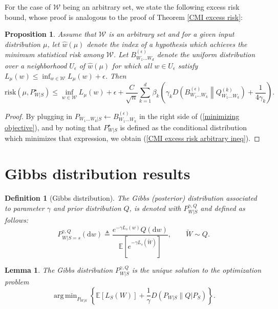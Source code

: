 \documentclass{article}
\DeclareMathOperator*{\argmin}{arg\,min}
\newtheorem{definition}{Definition}
\newtheorem{lemma}{Lemma}
\newtheorem{proposition}{Proposition}
\newcommand{\E}{\mathbb{E}}
\newcommand{\risk}[0]{\mathrm{risk}}
\newcommand{\W}[0]{\mathcal{W}}
\begin{document}
For the case of $\W$ being an arbitrary set, we state the following excess risk bound, whose proof is analogous to the proof of Theorem \ref{CMI excess risk}: 
\begin{proposition}\label{CMI excess risk arbitrary} Assume that $\W$ is an arbitrary set and for a given input distribution $\mu$, let $\widehat{w}(\mu)$ denote the index of a hypothesis which achieves the minimum statistical risk among $\W$. Let $B^{(\epsilon)}_{W_1\dots W_d}$ denote the uniform distribution over a neighborhood $U_{\epsilon}$ of $\widehat{w}(\mu)$ for which all $w\in U_{\epsilon}$ satisfy $L_{\mu}(w)\leq \inf_{w\in\W} L_{\mu}(w)+\epsilon$. Then
	\begin{equation}\label{CMI excess risk arbitrary ineq}
		\risk\left(\mu, P_{W|S}^{\star}\right)\leq \inf_{w\in\W}L_{\mu}(w)+\epsilon+\frac{C}{\sqrt{n}}\sum_{k=1}^d \beta_k\left(\gamma_k D\left(B^{(\epsilon)}_{W_1\dots W_k}\middle\|Q^{(k)}_{W_1\dots W_k}\right)+\frac{1}{4\gamma_k}\right).
\end{equation} 
\end{proposition}
\begin{proof}
By plugging in $P_{W_1\dots W_k|S}\leftarrow B^{(\epsilon)}_{W_1\dots W_k}$ in the right side of (\ref{minimizing objective}), and by noting that $P_{W|S}^{\star}$ is defined as the conditional distribution which minimizes that expression, we obtain (\ref{CMI excess risk arbitrary ineq}). 
\end{proof}

\section{Gibbs distribution results}\label{Gibbs algorithms section}

\begin{definition}[Gibbs distribution]\label{Gibbs distribution definition} The Gibbs (posterior) distribution associated to parameter $\gamma$ and prior distribution $Q$, is denoted with $P^{\gamma,Q}_{W|S}$ and defined as follows:
\begin{equation}
	P^{\gamma,Q}_{W|S=s}(\mathrm{d}w)\triangleq \frac{e^{-\gamma L_{s}(w)}Q(\mathrm{d}w) }{\E[e^{-\gamma L_{s}(\widetilde{W})}]}, \qquad \widetilde{W}\sim Q. \nonumber
\end{equation}
\end{definition}
\begin{lemma}\label{Gibbs optimizes}\cite{xu2017information}
	The Gibbs distribution $P^{\gamma,Q}_{W|S}$ is the unique solution to the optimization problem 
	\begin{equation}
		\argmin_{P_{W|S}}\left\{\E[L_S(W)]+\frac{1}{\gamma}D(P_{W|S}\|Q|P_S) \right\}.\nonumber
	\end{equation}
\end{lemma}
\end{document}
